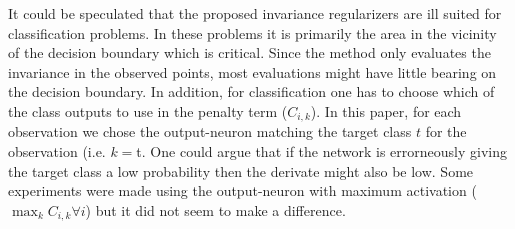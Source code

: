 It could be speculated that the proposed invariance regularizers are ill suited for classification problems. In these problems it is primarily the area in the vicinity of the decision boundary which is critical. Since the method only evaluates the invariance in the observed points, most evaluations might have little bearing on the decision boundary. In addition, for classification one has to choose which of the class outputs to use in the penalty term ($C_{i,k}$). In this paper, for each observation we chose the output-neuron matching the target class $t$ for the observation (i.e. $k=$t. One could argue that if the network is errorneously giving the target class a low probability then the derivate might also be low. Some experiments were made using the output-neuron with maximum activation ($\max_k C_{i,k} \forall i$) but it did not seem to make a difference.

